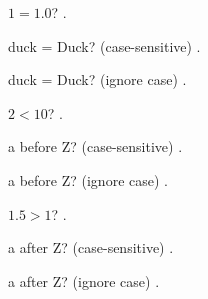 \documentclass[12pt]{article}
\begin{document}
$1 = 1.0$? . 

duck = Duck? (case-sensitive) . 

duck = Duck? (ignore case) . 

$2 < 10$? . 

a before Z? (case-sensitive) . 

a before Z? (ignore case) . 

$1.5 > 1$? . 

a after Z? (case-sensitive) . 

a after Z? (ignore case) . 
\end{document}
